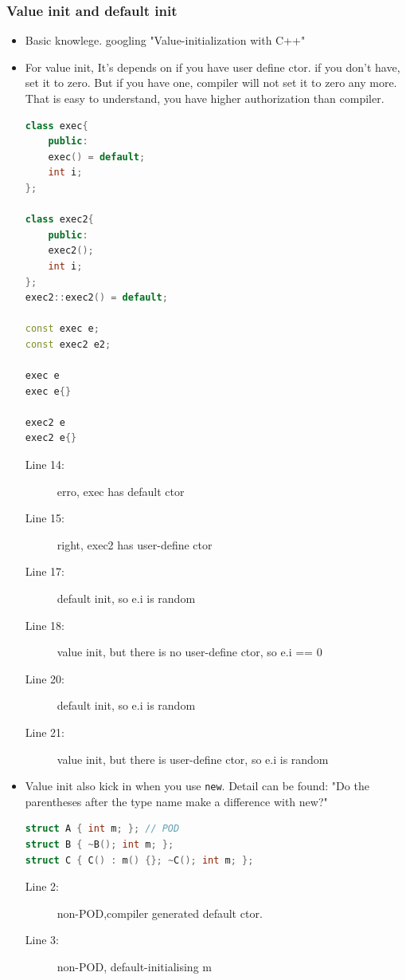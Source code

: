 \documentclass[a4paper,11pt,twoside]{book}
\begin{document}
\subsubsection{Value init and default init}
\begin{itemize}
	\item Basic knowlege. googling "Value-initialization with C++"
	
	\item For value init, It's depends on if you have user define ctor. if you don't have, set it to zero. But if you have one, compiler will not set it to zero any more. That is easy to understand, you have higher authorization than compiler. 
	
\begin{lstlisting}[frame=single, language=c++]
class exec{
	public:
	exec() = default;
	int i;
};
	
class exec2{
	public:
	exec2();
	int i;
};
exec2::exec2() = default;
	
const exec e;      
const exec2 e2;    

exec e    
exec e{}  
	
exec2 e  
exec2 e{}  
\end{lstlisting}
\begin{description}
	\item[Line 14:] erro, exec has default ctor
	\item[Line 15:] right, exec2 has user-define ctor
	\item[Line 17:] default init, so e.i is random
	\item[Line 18:] value init, but there is no user-define ctor, so e.i == 0
	\item[Line 20:] default init, so e.i is random
	\item[Line 21:] value init, but there is user-define ctor, so e.i is random
\end{description}
	
	\item Value init also kick in when you use \texttt{new}. Detail can be found: "Do the parentheses after the type name make a difference with new?"
	
\begin{lstlisting}[frame=single, language=c++]
struct A { int m; }; // POD
struct B { ~B(); int m; }; 
struct C { C() : m() {}; ~C(); int m; }; 
\end{lstlisting}
\begin{description}
	\item[Line 2:] non-POD,compiler generated default ctor.
	\item[Line 3:] non-POD, default-initialising m
\end{description}
	

\end{itemize}
\end{document}
